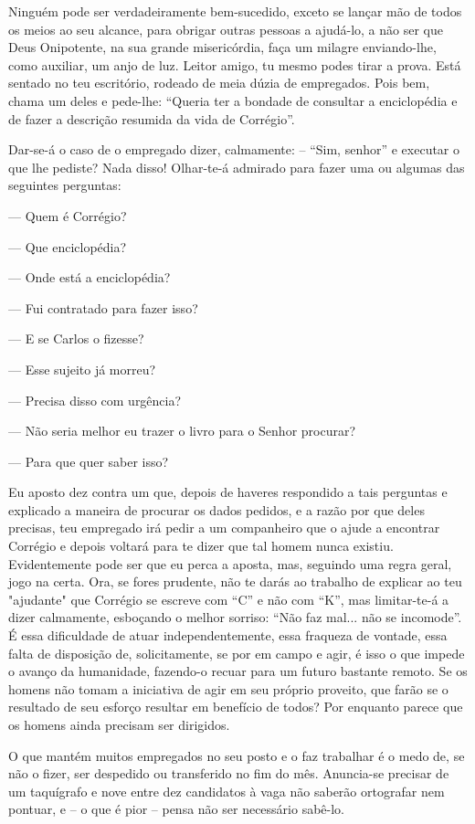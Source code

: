 Ninguém pode ser verdadeiramente bem-sucedido, exceto se lançar mão de todos os meios ao seu alcance, para obrigar outras pessoas a ajudá-lo, a não ser que Deus Onipotente, na sua grande misericórdia, faça um milagre enviando-lhe, como auxiliar, um anjo de luz. Leitor amigo, tu mesmo podes tirar a prova. Está sentado no teu escritório, rodeado de meia dúzia de empregados. Pois bem, chama um deles e pede-lhe: ``Queria ter a bondade de consultar a enciclopédia e de fazer a descrição resumida da vida de Corrégio''.

Dar-se-á o caso de o empregado dizer, calmamente: –  ``Sim, senhor'' e executar o que lhe pediste? Nada disso! Olhar-te-á admirado para fazer uma ou algumas das seguintes perguntas:

---  Quem é Corrégio?

---  Que enciclopédia?

---  Onde está a enciclopédia?

---  Fui contratado para fazer isso?

--- E se Carlos o fizesse?

---  Esse sujeito já morreu?

--–  Precisa disso com urgência?

--–  Não seria melhor eu trazer o livro para o Senhor procurar?

–-- Para que quer saber isso?

Eu aposto dez contra um que, depois de haveres respondido a tais perguntas e explicado a maneira de procurar os dados pedidos, e a razão por que deles precisas, teu empregado irá pedir a um companheiro que o ajude a encontrar Corrégio e depois voltará para te dizer que tal homem nunca existiu. Evidentemente pode ser que eu perca a aposta, mas, seguindo uma regra geral, jogo na certa. Ora, se fores prudente, não te darás ao trabalho de explicar ao teu "ajudante" que Corrégio se escreve com ``C'' e não com ``K'', mas limitar-te-á a dizer calmamente, esboçando o melhor sorriso: ``Não faz mal... não se incomode''. É essa dificuldade de atuar independentemente, essa fraqueza de vontade, essa falta de disposição de, solicitamente, se por em campo e agir, é isso o que impede o avanço da humanidade, fazendo-o recuar para um futuro bastante remoto. Se os homens não tomam a iniciativa de agir em seu próprio proveito, que farão se o resultado de seu esforço resultar em benefício de todos? Por enquanto parece que os homens ainda precisam ser dirigidos.

O que mantém muitos empregados no seu posto e o faz trabalhar é o medo de, se não o fizer, ser despedido ou transferido no fim do mês. Anuncia-se precisar de um taquígrafo e nove entre dez candidatos à vaga não saberão ortografar nem pontuar, e –  o que é pior – pensa não ser necessário sabê-lo.

